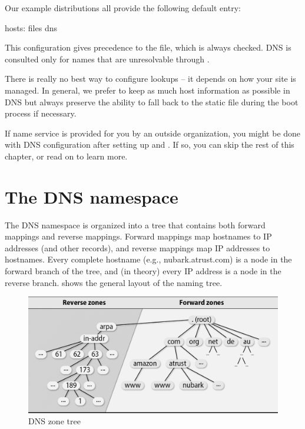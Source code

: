 Our example distributions all provide the following default  entry:
\begin{config}
hosts: files dns
\end{config}

This configuration gives precedence to the  file, which is always checked.
DNS is consulted only for names that are unresolvable through .

There is really no best way to configure lookups -- it depends on how your site is managed.
In general, we prefer to keep as much host
information as possible in DNS but always preserve the ability to fall back to the static  file during the boot process if necessary.

If name service is provided for you by an outside organization,
you might be done with DNS configuration after setting up  and .
If so, you can skip the rest of this chapter, or read on to learn more.




\section{The DNS namespace}

\protect\hypertarget{part0024_split_007.htmlux5cux23_idIndexMarker1984}{}{}The
DNS namespace is organized into a tree that contains both
\protect\hypertarget{part0024_split_007.htmlux5cux23_idIndexMarker1985}{}{}forward
mappings and
\protect\hypertarget{part0024_split_007.htmlux5cux23_idIndexMarker1986}{}{}reverse
mappings. Forward mappings map hostnames to IP addresses (and other
records), and reverse mappings map IP addresses to hostnames. Every
complete hostname (e.g., nubark.atrust.com) is a node in the forward
branch of the tree, and (in theory) every IP address is a node in the
reverse branch.
 shows the general layout of the naming tree.


\begin{figure}
   \centering
   \includegraphics[width=\textwidth]{images/00626.png}
   \caption{DNS zone tree}
   \label{fig:dns-zone-tree}
\end{figure}


